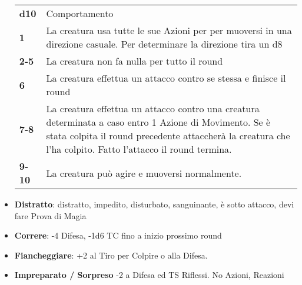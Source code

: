 \documentclass[landscape,10pt,a4paper]{article}
\begin{document}
\begin{multicols}{3}
\begin{dmbox}[title=Condizioni - pagina \pageref{condizioni}]
\begin{itemize}[leftmargin=0.5cm,itemsep=-1pt,parsep=0pt]
\noindent\begin{tabularx}{0.99\textwidth}{lX}
\hline
\textbf{d10} & Comportamento\\
\textbf{1} & La creatura usa tutte le sue Azioni per per muoversi in una direzione casuale. Per determinare la direzione tira un d8\\
\textbf{2-5} & La creatura non fa nulla per tutto il round\\
\textbf{6} & La creatura effettua un attacco contro se stessa e finisce il round\\
\textbf{7-8} & La creatura effettua un attacco contro una creatura determinata a caso entro 1 Azione di Movimento. Se è stata colpita il round precedente attaccherà la creatura che l'ha colpito. Fatto l'attacco il round termina.\\
\textbf{9-10} & La creatura può agire e muoversi normalmente.
\end{tabularx}

\item \textbf{Distratto}: distratto, impedito, disturbato, sanguinante, è sotto attacco, devi fare Prova di Magia
\item \textbf{Correre}: -4 Difesa, -1d6 TC fino a inizio prossimo round
\item \textbf{Fiancheggiare}: +2 al Tiro per Colpire o alla Difesa.
\item \textbf{Impreparato / Sorpreso} -2 a Difesa ed TS Riflessi. No Azioni, Reazioni
\end{itemize}

\end{dmbox}



\begin{dmbox}[title=Condizioni]
\begin{itemize}[leftmargin=0.5cm,itemsep=-1pt,parsep=0pt]


\end{itemize}
\end{dmbox}
\end{multicols}
\end{document}

